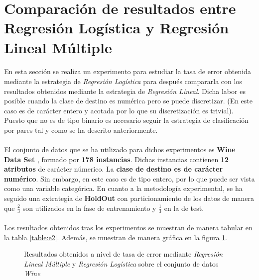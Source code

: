 \documentclass{article}
\begin{document}
	\section{Comparación de resultados entre Regresión Logística y Regresión Lineal Múltiple}
	\label{sec:e2}

		\paragraph{}
		En esta sección se realiza un experimento para estudiar la tasa de error obtenida mediante la estrategia de \emph{Regresión Logística} para después compararla con los resultados obtenidos mediante la estrategia de \emph{Regresión Lineal}. Dicha labor es posible cuando la clase de destino es numérica pero se puede discretizar. (En este caso es de carácter entero y acotada por lo que su discretización es trivial). Puesto que no es de tipo binario es necesario seguir la estrategía de clasificación por pares tal y como se ha descrito anteriormente.

		\paragraph{}
		El conjunto de datos que se ha utilizado para dichos experimentos es \textbf{Wine Data Set} \cite{dataset:wine}, formado por \textbf{178 instancias}. Dichas instancias contienen \textbf{12 atributos} de carácter númerico. La \textbf{clase de destino es de carácter numérico}. Sin embargo, en este caso es de tipo entero, por lo que puede ser vista como una variable categórica. En cuanto a la metodología experimental, se ha seguido una extrategia de \textbf{HoldOut} con particionamiento de los datos de manera que $\frac{2}{3}$ son utilizados en la fase de entrenamiento y $\frac{1}{3}$ en la de test.

		\paragraph{}
		Los resultados obtenidos tras los experimentos se muestran de manera tabular en la tabla \ref{table:e2}. Además, se muestran de manera gráfica en la figura \ref{plot:e2}.


		\begin{figure}[h]
			\begin{center}
			\end{center}
			\caption{Resultados obtenidos a nivel de tasa de error mediante \emph{Regresión Lineal Múltiple} y \emph{Regresión Logística} sobre el conjunto de datos \emph{Wine}}
			\label{plot:e2}
		\end{figure}
\end{document}

